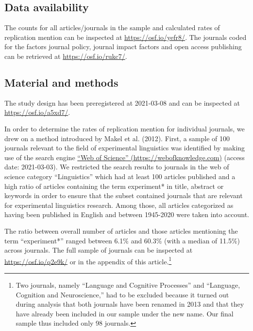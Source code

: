 \documentclass[]{elsarticle} %
\begin{document}
\hypertarget{data-availability}{%
\subsection{Data availability}\label{data-availability}}

The counts for all articles/journals in the sample and calculated rates of replication mention can be inspected at \url{https://osf.io/yefr8/}. The journals coded for the factors journal policy, journal impact factors and open access publishing can be retrieved at \url{https://osf.io/rukc7/}.

\hypertarget{material-and-methods}{%
\subsection{Material and methods}\label{material-and-methods}}

The study design has been preregistered at 2021-03-08 and can be inspected at \url{https://osf.io/a5xd7/}.

In order to determine the rates of replication mention for individual journals, we drew on a method introduced by Makel et al. (2012).
First, a sample of 100 journals relevant to the field of experimental linguistics was identified by making use of the search engine \href{https://webofknowledge.com}{``Web of Science'' (https://webofknowledge.com)} (access date: 2021-03-03). We restricted the search results to journals in the web of science category ``Linguistics'' which had at least 100 articles published and a high ratio of articles containing the term experiment* in title, abstract or keywords in order to ensure that the subset contained journals that are relevant for experimental linguistics research. Among those, all articles categorized as having been published in English and between 1945-2020 were taken into account.

The ratio between overall number of articles and those articles mentioning the term ``experiment*'' ranged between 6.1\% and 60.3\% (with a median of 11.5\%) across journals.
The full sample of journals can be inspected at \url{https://osf.io/q2e9k/} or in the appendix of this article.\footnote{Two journals, namely ``Language and Cognitive Processes'' and ``Language, Cognition and Neuroscience,'' had to be excluded because it turned out during analysis that both journals have been renamed in 2013 and that they have already been included in our sample under the new name. Our final sample thus included only 98 journals.}
\end{document}
